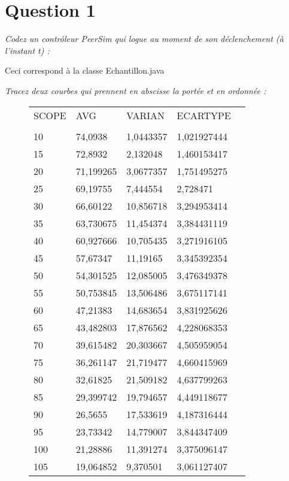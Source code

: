 \documentclass[11pt,a4paper,sans]{report}
\begin{document}
	\section{Question 1}
	\textit{Codez un contrôleur PeerSim qui logue au moment de son déclenchement (à l’instant
		t) :}
	\par Ceci correspond à la classe Echantillon.java

	\textit{Tracez deux courbes qui prennent en abscisse la portée et en ordonnée :}

	\begin{figure}[H]
		\centering
		\begin{tabular}{lllll}
			SCOPE   & AVG       & VARIAN    & ECARTYPE    &  \\
			&           &           &             &  \\
			10  & 74,0938   & 1,0443357 & 1,021927444 &  \\
			15  & 72,8932   & 2,132048  & 1,460153417 &  \\
			20  & 71,199265 & 3,0677357 & 1,751495275 &  \\
			25  & 69,19755  & 7,444554  & 2,728471    &  \\
			30  & 66,60122  & 10,856718 & 3,294953414 &  \\
			35  & 63,730675 & 11,454374 & 3,384431119 &  \\
			40  & 60,927666 & 10,705435 & 3,271916105 &  \\
			45  & 57,67347  & 11,19165  & 3,345392354 &  \\
			50  & 54,301525 & 12,085005 & 3,476349378 &  \\
			55  & 50,753845 & 13,506486 & 3,675117141 &  \\
			60  & 47,21383  & 14,683654 & 3,831925626 &  \\
			65  & 43,482803 & 17,876562 & 4,228068353 &  \\
			70  & 39,615482 & 20,303667 & 4,505959054 &  \\
			75  & 36,261147 & 21,719477 & 4,660415969 &  \\
			80  & 32,61825  & 21,509182 & 4,637799263 &  \\
			85  & 29,399742 & 19,794657 & 4,449118677 &  \\
			90  & 26,5655   & 17,533619 & 4,187316444 &  \\
			95  & 23,73342  & 14,779007 & 3,844347409 &  \\
			100 & 21,28886  & 11,391274 & 3,375096147 &  \\
			105 & 19,064852 & 9,370501  & 3,061127407 &  \\

\end{tabular}
\end{figure}
\end{document}
